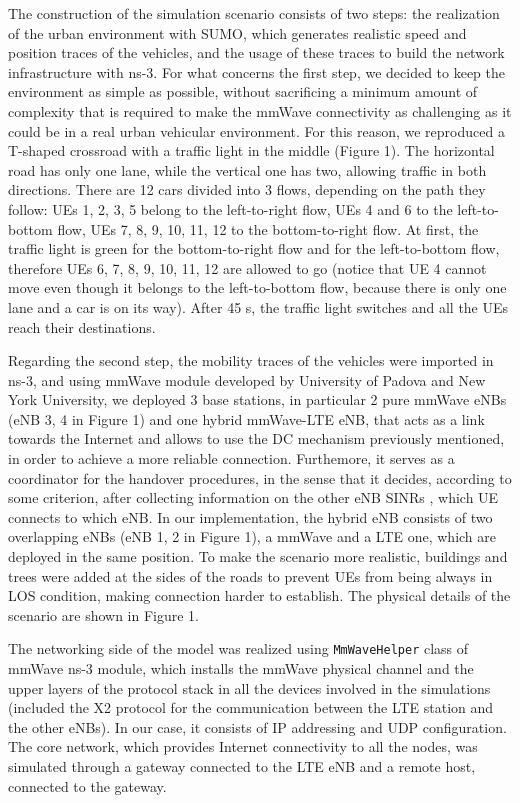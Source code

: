 \documentclass[conference,10pt]{IEEEtran}
\begin{document}
The construction of the simulation scenario consists of two steps: the realization of the urban environment with SUMO, which generates realistic speed and position traces of the vehicles, and the usage of these traces to build the network infrastructure with ns-3.
For what concerns the first step, we decided to keep the environment as simple as possible, without sacrificing a minimum amount of complexity that is required to make the mmWave connectivity as challenging as it could be in a real urban vehicular environment. For this reason, we reproduced a T-shaped crossroad with a traffic light in the middle (Figure 1). The horizontal road has only one lane, while the vertical one has two, allowing traffic in both directions. There are 12 cars divided into 3 flows, depending on the path they follow: UEs 1, 2, 3, 5 belong to the left-to-right flow, UEs 4 and 6 to the left-to-bottom flow, UEs 7, 8, 9, 10, 11, 12 to the bottom-to-right flow.
At first, the traffic light is green for the bottom-to-right flow and for the left-to-bottom flow, therefore UEs 6, 7, 8, 9, 10, 11, 12 are allowed to go (notice that UE 4 cannot move even though it belongs to the left-to-bottom flow, because there is only one lane and a car is on its way). After 45 s, the traffic light switches and all the UEs reach their destinations.


Regarding the second step, the mobility traces of the vehicles were imported in ns-3, and using mmWave module developed by University of Padova and New York University, we deployed 3 base stations, in particular 2 pure mmWave eNBs (eNB 3, 4 in Figure 1) and one hybrid mmWave-LTE eNB, that acts as a link towards the Internet and allows to use the DC mechanism previously mentioned, in order to achieve a more reliable connection. Furthemore, it serves as a coordinator for the handover procedures, in the sense that it decides, according to some criterion, after collecting information on the other eNB SINRs , which UE connects to which eNB. In our implementation, the hybrid eNB consists of two overlapping eNBs (eNB 1, 2 in Figure 1), a mmWave and a LTE one, which are deployed in the same position. To make the scenario more realistic, buildings and trees were added at the sides of the roads to prevent UEs from being always in LOS condition, making connection harder to establish. The physical details of the scenario are shown in Figure 1.


The networking side of the model was realized using \texttt{MmWaveHelper} class of mmWave ns-3 module, which installs the mmWave physical channel and the upper layers of the protocol stack in all the devices involved in the simulations (included the X2 protocol for the communication between the LTE station and the other eNBs). In our case, it consists of IP addressing and UDP configuration. The core network, which provides Internet connectivity to all the nodes, was simulated through a gateway connected to the LTE eNB and a remote host, connected to the gateway. 
\end{document}
